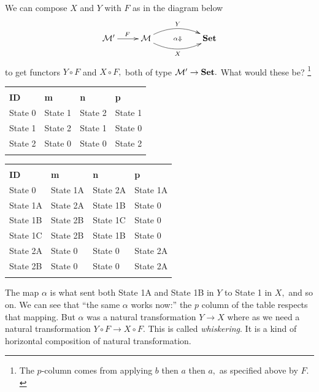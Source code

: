 \documentclass[../main/CT4S-EN-RU]{subfiles}
\begin{document}
\begin{exampleENG}[Whiskering]
We can compose $X$ and $Y$ with $F$ as in the diagram below
$$
\xymatrix{\mcM'\ar[r]^F&\mcM\ar@/^1pc/[rr]^Y\ar@/_1pc/[rr]_X\ar@{}[rr]|{\alpha\Down}&&\Set}
$$
to get functors $Y\circ F$ and $X\circ F,$ both of type $\mathcal{M}'\rightarrow{\mathbf{Set}}.$ What would these be?
\footnote{The $p$-column comes from applying $b$ then $a$ then $a,$ as specified above by $F.$}
\begin{center}\footnotesize
\begin{tabular}{| l || l | l | l |}\bhline
\multicolumn{4}{|c|}{$X\circ F$}\\\bhline
{\bf ID}&{\bf m}&{\bf n}&{\bf p}\\\bbhline
State 0&State 1&State 2&State 1\\\hline
State 1& State 2& State 1&State 0\\\hline
State 2&State 0&State 0&State 2\\\bhline
\end{tabular}
\hspace{.5in}
\begin{tabular}{| l || l | l | l |}\bhline
\multicolumn{4}{|c|}{$Y\circ F$}\\\bhline
{\bf ID}&{\bf m}&{\bf n}&{\bf p}\\\bbhline
State 0&State 1A&State 2A&State 1A\\\hline
State 1A& State 2A& State 1B&State 0\\\hline
State 1B& State 2B& State 1C&State 0\\\hline
State 1C&State 2B&State 1B&State 0\\\hline
State 2A&State 0&State 0&State 2A\\\hline
State 2B&State 0&State 0&State 2A\\\bhline
\end{tabular}
\end{center}

The map $\alpha$ is what sent both State 1A and State 1B in $Y$ to State 1 in $X,$ and so on. We can see that “the same $\alpha$ works now:” the $p$ column of the table respects that mapping. But $\alpha$ was a natural transformation $Y\to X$ where as we need a natural transformation $Y\circ F\to X\circ F.$ This is called {\em whiskering}. It is a kind of horizontal composition of natural transformation.
\end{exampleENG}

\begin{exampleRUS}[Whiskering]\label{ex:whiskering}
\end{exampleRUS}
\end{document}
